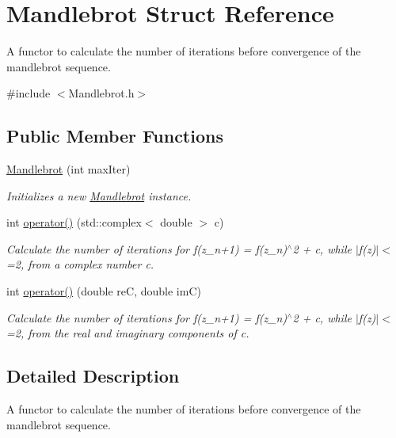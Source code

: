 \hypertarget{struct_mandlebrot}{}\section{Mandlebrot Struct Reference}
\label{struct_mandlebrot}


A functor to calculate the number of iterations before convergence of the mandlebrot sequence.  




{\ttfamily \#include $<$Mandlebrot.\+h$>$}

\subsection*{Public Member Functions}
\begin{DoxyCompactItemize}
\item 
\hyperlink{struct_mandlebrot_ab6d9fdcf93a8a8a396f28c8a352520a6}{Mandlebrot} (int max\+Iter)
\begin{DoxyCompactList}\small\item\em Initializes a new \hyperlink{struct_mandlebrot}{Mandlebrot} instance. \end{DoxyCompactList}\item 
int \hyperlink{struct_mandlebrot_a56d1e2fce182328322d3ebb1a78b9b90}{operator()} (std\+::complex$<$ double $>$ c)
\begin{DoxyCompactList}\small\item\em Calculate the number of iterations for f(z\+\_\+n+1) = f(z\+\_\+n)$^\wedge$2 + c, while $\vert$f(z)$\vert$$<$=2, from a complex number c. \end{DoxyCompactList}\item 
\hypertarget{struct_mandlebrot_a34f5e04a19852ac819d9be3b4057e0f3}{}int \hyperlink{struct_mandlebrot_a34f5e04a19852ac819d9be3b4057e0f3}{operator()} (double re\+C, double im\+C)\label{struct_mandlebrot_a34f5e04a19852ac819d9be3b4057e0f3}

\begin{DoxyCompactList}\small\item\em Calculate the number of iterations for f(z\+\_\+n+1) = f(z\+\_\+n)$^\wedge$2 + c, while $\vert$f(z)$\vert$$<$=2, from the real and imaginary components of c. \end{DoxyCompactList}\end{DoxyCompactItemize}


\subsection{Detailed Description}
A functor to calculate the number of iterations before convergence of the mandlebrot sequence. 

